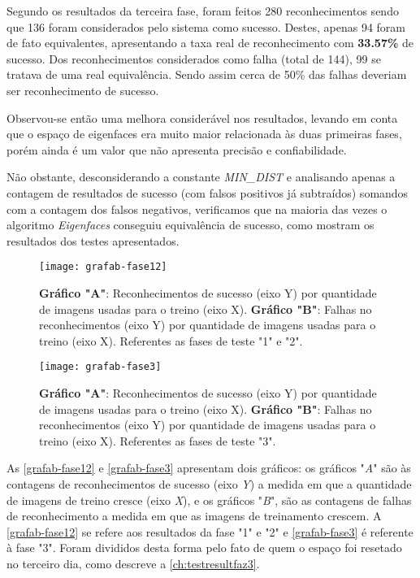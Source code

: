 Segundo os resultados da terceira fase, foram feitos 280 reconhecimentos sendo que 136 foram considerados pelo sistema como sucesso. Destes, apenas 94 foram de fato equivalentes, apresentando a taxa real de reconhecimento com \textbf{33.57\%} de sucesso. Dos reconhecimentos considerados como falha (total de 144), 99 se tratava de uma real equivalência. Sendo assim cerca de 50\% das falhas deveriam ser reconhecimento de sucesso.

Observou-se então uma melhora considerável nos resultados, levando em conta que o espaço de eigenfaces era muito maior relacionada às duas primeiras fases, porém ainda é um valor que não apresenta precisão e confiabilidade. 

Não obstante, desconsiderando a constante \textit{MIN\_DIST} e analisando apenas a contagem de resultados de sucesso (com falsos positivos já subtraídos) somandos com a contagem dos falsos negativos, verificamos que na maioria das vezes o algoritmo \textit{Eigenfaces} conseguiu equivalência de sucesso, como mostram os resultados dos testes apresentados.


\begin{figure}[h]
	\centering
	\texttt{[image: grafab-fase12]}
	\caption{\textbf{Gráfico "A"}: Reconhecimentos de sucesso (eixo Y) por quantidade de imagens usadas para o treino (eixo X). \textbf{Gráfico "B"}: Falhas no reconhecimentos (eixo Y) por quantidade de imagens usadas para o treino (eixo X). Referentes as fases de teste "1" e "2".}
	\label{grafab-fase12}
\end{figure}

\begin{figure}[h]
	\centering
	\texttt{[image: grafab-fase3]}
	\caption{\textbf{Gráfico "A"}: Reconhecimentos de sucesso (eixo Y) por quantidade de imagens usadas para o treino (eixo X). \textbf{Gráfico "B"}: Falhas no reconhecimentos (eixo Y) por quantidade de imagens usadas para o treino (eixo X). Referentes as fases de teste "3".}
	\label{grafab-fase3}
\end{figure}


As \autoref{grafab-fase12} e \autoref{grafab-fase3} apresentam dois gráficos: os gráficos "\textit{A}" são às contagens de reconhecimentos de sucesso (eixo \textit{Y}) a medida em que a quantidade de imagens de treino cresce (eixo \textit{X}), e os gráficos "\textit{B}", são as contagens de falhas de reconhecimento a medida em que as imagens de treinamento crescem. A \autoref{grafab-fase12} se refere aos resultados da fase "1" e "2" e \autoref{grafab-fase3} é referente à fase "3". Foram divididos desta forma pelo fato de quem o espaço foi resetado no terceiro dia, como descreve a \autoref{ch:testresultfaz3}. 

